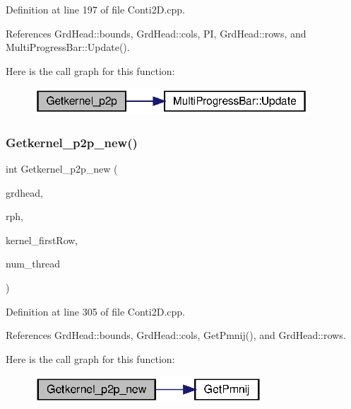 Definition at line 197 of file Conti2\+D.\+cpp.



References Grd\+Head\+::bounds, Grd\+Head\+::cols, PI, Grd\+Head\+::rows, and Multi\+Progress\+Bar\+::\+Update().

Here is the call graph for this function\+:\nopagebreak
\begin{figure}[H]
\begin{center}
\leavevmode
\includegraphics[width=292pt]{Conti2D_8h_a771b48a44ec12bf118f2fbf3789a7d70_a771b48a44ec12bf118f2fbf3789a7d70_cgraph}
\end{center}
\end{figure}
\mbox{\label{Conti2D_8h_a1d72c3a10bd62305a91d64bb0de2b247_a1d72c3a10bd62305a91d64bb0de2b247}} 
\subsubsection{Getkernel\+\_\+p2p\+\_\+new()\hspace{0.1cm}{\footnotesize\ttfamily [1/2]}}
{\footnotesize\ttfamily int Getkernel\+\_\+p2p\+\_\+new (\begin{DoxyParamCaption}\item[{\textbf{ Grd\+Head}}]{grdhead,  }\item[{double}]{rph,  }\item[{double $\ast$}]{kernel\+\_\+first\+Row,  }\item[{int}]{num\+\_\+thread }\end{DoxyParamCaption})}



Definition at line 305 of file Conti2\+D.\+cpp.



References Grd\+Head\+::bounds, Grd\+Head\+::cols, Get\+Pmnij(), and Grd\+Head\+::rows.

Here is the call graph for this function\+:\nopagebreak
\begin{figure}[H]
\begin{center}
\leavevmode
\includegraphics[width=243pt]{Conti2D_8h_a1d72c3a10bd62305a91d64bb0de2b247_a1d72c3a10bd62305a91d64bb0de2b247_cgraph}
\end{center}
\end{figure}
\mbox{\label{Conti2D_8h_a6f44a06f2b4926f66481fccf277bea50_a6f44a06f2b4926f66481fccf277bea50}} 
